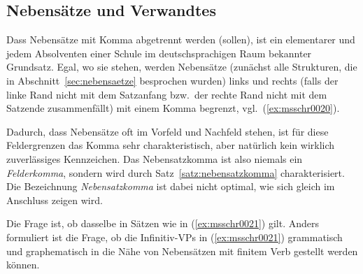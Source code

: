 \subsection{Nebensätze und Verwandtes}

\label{sec:nebensatzschreib}

Dass Nebensätze mit Komma abgetrennt werden (sollen), ist ein elementarer und jedem Absolventen einer Schule im deutschsprachigen Raum bekannter Grundsatz.
Egal, wo sie stehen, werden Nebensätze (zunächst alle Strukturen, die in Abschnitt~\ref{sec:nebensaetze} besprochen wurden) links und rechts (falls der linke Rand nicht mit dem Satzanfang bzw.\ der rechte Rand nicht mit dem Satzende zusammenfällt) mit einem Komma begrenzt, vgl.\ (\ref{ex:msschr0020}).

\begin{exe}
  \ex\label{ex:msschr0020} 
  \begin{xlist}
  \end{xlist}
\end{exe}

Dadurch, dass Nebensätze oft im Vorfeld und Nachfeld stehen, ist für diese Feldergrenzen das Komma sehr charakteristisch, aber natürlich kein wirklich zuverlässiges Kennzeichen.
Das Nebensatzkomma ist also niemals ein \textit{Felderkomma}, sondern wird durch Satz~\ref{satz:nebensatzkomma} charakterisiert.
Die Bezeichnung \textit{Nebensatzkomma} ist dabei nicht optimal, wie sich gleich im Anschluss zeigen wird.



Die Frage ist, ob dasselbe in Sätzen wie in (\ref{ex:msschr0021}) gilt.
Anders formuliert ist die Frage, ob die Infinitiv-VPs in (\ref{ex:msschr0021}) grammatisch und graphematisch in die Nähe von Nebensätzen mit finitem Verb gestellt werden können.

\begin{exe}
  \ex\label{ex:msschr0021} 
  \begin{xlist}
  \end{xlist}
\end{exe}

